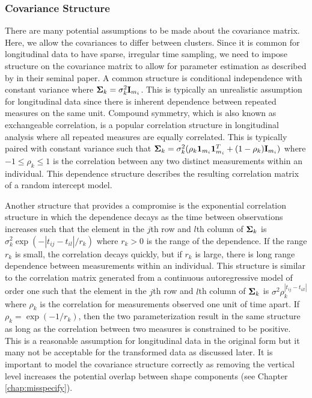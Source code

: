 \subsubsection{Covariance Structure}
There are many potential assumptions to be made about the covariance matrix. Here, we allow the covariances to differ between clusters. Since it is common for longitudinal data to have sparse, irregular time sampling, we need to impose structure on the covariance matrix to allow for parameter estimation as described by \textcite{jennrich1986} in their seminal paper. A common structure is conditional independence with constant variance where $\mathbf \Sigma_{k}= \sigma_{k}^{2}\mathbf I_{m_{i}}$. This is typically an unrealistic assumption for longitudinal data since there is inherent dependence between repeated measures on the same unit. Compound symmetry, which is also known as exchangeable correlation, is a popular correlation structure in longitudinal analysis where all repeated measures are equally correlated. This is typically paired with constant variance such that $\mathbf \Sigma_{k} = \sigma_{k}^{2}(\rho_{k}\mathbf1_{m_{i}}\mathbf1_{m_{i}}^{T}+(1-\rho_{k})\mathbf I_{m_{i}})$ where $-1\leq\rho_{k}\leq 1$ is the correlation between any two distinct measurements within an individual. This dependence structure describes the resulting correlation matrix of a random intercept model.

Another structure that provides a compromise is the exponential correlation structure in which the dependence decays as the time between observations increases such that the element in the $j$th row and $l$th column of $\boldsymbol\Sigma_{k}$ is $\sigma_{k}^{2}\exp(-| t_{ij}-t_{il}| / r_{k})$ where $r_{k}> 0$ is the range of the dependence. If the range $r_{k}$ is small, the correlation decays quickly, but if $r_{k}$ is large, there is long range dependence between measurements within an individual. This structure is similar to the correlation matrix generated from a continuous autoregressive model of order one such that the element in the $j$th row and $l$th column of $\boldsymbol\Sigma_{k}$ is $\sigma^{2}\rho_{k}^{|t_{ij}-t_{ill}|}$ where $\rho_{k}$ is the correlation for measurements observed one unit of time apart. If $\rho_{k} = \exp(-1/r_{k})$, then the two parameterization result in the same structure as long as the correlation between two measures is constrained to be positive. This is a reasonable assumption for longitudinal data in the original form but it many not be acceptable for the transformed data as discussed later. It is important to model the covariance structure correctly as removing the vertical level increases the potential overlap between shape components (see Chapter \ref{chap:misspecify}). 


